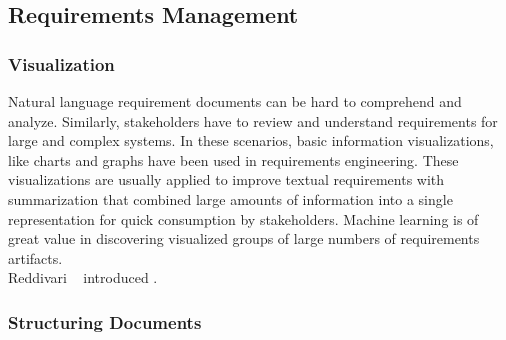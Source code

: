 \subsection{Requirements Management}

\subsubsection{Visualization}

Natural language requirement documents can be hard to comprehend and analyze. Similarly, stakeholders have to review and understand requirements for large and complex systems.  In these scenarios, basic information visualizations, like charts and graphs have been used in requirements engineering. These visualizations are usually applied to improve textual requirements with summarization that combined large amounts of information into a single representation for quick consumption by stakeholders\cite{Reddivari:2012}. Machine learning is of great value in discovering visualized groups of large numbers of requirements artifacts.\\

Reddivari \etal~\cite{Reddivari:2012} introduced .\newline

\cite{Pinqui:2015}

\subsubsection{Structuring Documents}

